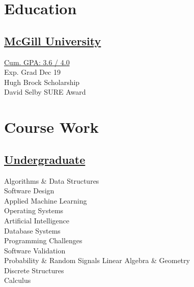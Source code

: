 \documentclass[]{sumbal-resume}
\begin{document}
\header

\begin{minipage}[t]{0.33\textwidth}



\section{Education}
\subsection{\href{http://www.abdullahsumbal.com/doc/transcript.pdf}{McGill University}}
\href{http://www.abdullahsumbal.com/doc/transcript.pdf}{Cum. GPA: 3.6 / 4.0}\\
Exp. Grad Dec 19 \\
Hugh Brock Scholarship \\
David Selby SURE Award
\sectionsep

\section{Course Work }
\subsection{\href{http://www.abdullahsumbal.com/doc/transcript.pdf}{Undergraduate}}
Algorithms \& Data Structures \\
Software Design \\
Applied Machine Learning \\
Operating Systems \\
Artificial Intelligence \\
Database Systems\\
Programming Challenges \\
Software Validation \\
Probability \& Random Signals
Linear Algebra \& Geometry \\
Discrete Structures \\
Calculus \\
\sectionsep


\end{minipage}
\end{document}
